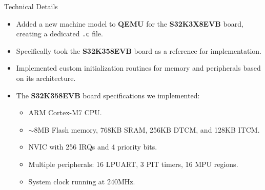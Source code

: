 \begin{frame}{Technical Details}
    \begin{itemize}
        \item Added a new machine model to \textbf{QEMU} for the \textbf{S32K3X8EVB} board, creating a dedicated \texttt{.c} file.
        \item Specifically took the \textbf{S32K358EVB} board as a reference for implementation.
        \item Implemented custom initialization routines for memory and peripherals based on its architecture.
        \item The \textbf{S32K358EVB} board specifications we implemented:
            \begin{itemize}
                \item ARM Cortex-M7 CPU.
                \item \(\sim \)8MB Flash memory, 768KB SRAM, 256KB DTCM, and 128KB ITCM.
                \item NVIC with 256 IRQs and 4 priority bits.
                \item Multiple peripherals: 16 LPUART, 3 PIT timers, 16 MPU regions.
                \item System clock running at 240MHz.
            \end{itemize}
    \end{itemize}
\end{frame}

